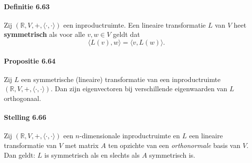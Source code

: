 \documentclass[11pt,oneside,a4paper]{article}
\begin{document}
	\paragraph{Definitie 6.63}
		Zij $(\mathbb{R},V,+, \langle \cdot , \cdot \rangle)$ een inproductruimte. Een lineaire transformatie $L$ van $V$ heet \textbf{symmetrisch} als voor alle $v, w \in V$ geldt dat $$\langle L(v) , w \rangle = \langle v , L(w) \rangle.$$
	\paragraph{Propositie 6.64}	
		Zij $L$ een symmetrische (lineaire) transformatie van een inproductruimte $(\mathbb{R},V,+, \langle \cdot , \cdot \rangle)$. Dan zijn eigenvectoren bij verschillende eigenwaarden van $L$ orthogonaal.
	\paragraph{Stelling 6.66}	
		Zij $(\mathbb{R},V,+, \langle \cdot , \cdot \rangle)$ een $n$-dimensionale inproductruimte en $L$ een lineaire transformatie van $V$ met matrix $A$ ten opzichte van een \textit{orthonormale} basis van $V$. Dan geldt: $L$ is symmetrisch als en slechts als $A$ symmetrisch is.
		
\end{document}
